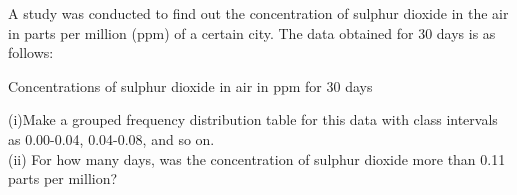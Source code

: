 A study was conducted to find out the concentration of sulphur dioxide in the air in parts per million (ppm) of a certain city. The data obtained for 30 days is as follows:
\begin{table}[ht!]
\centering

\caption{Concentrations of sulphur dioxide in air in ppm for 30 days}
\label{table:sulphurdioxide_concentration}
\end{table}
(i)Make a grouped frequency distribution table for this data with class intervals as 0.00-0.04, 0.04-0.08, and so on.\\
(ii) For how many days, was the concentration of sulphur dioxide more than 0.11 parts per million?\\
